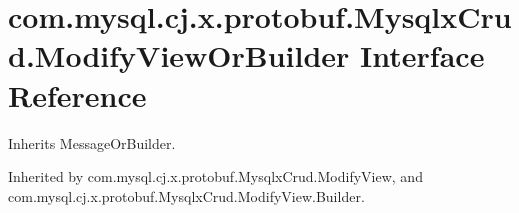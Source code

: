 \hypertarget{interfacecom_1_1mysql_1_1cj_1_1x_1_1protobuf_1_1_mysqlx_crud_1_1_modify_view_or_builder}{}\section{com.\+mysql.\+cj.\+x.\+protobuf.\+Mysqlx\+Crud.\+Modify\+View\+Or\+Builder Interface Reference}
\label{interfacecom_1_1mysql_1_1cj_1_1x_1_1protobuf_1_1_mysqlx_crud_1_1_modify_view_or_builder}


Inherits Message\+Or\+Builder.



Inherited by com.\+mysql.\+cj.\+x.\+protobuf.\+Mysqlx\+Crud.\+Modify\+View, and com.\+mysql.\+cj.\+x.\+protobuf.\+Mysqlx\+Crud.\+Modify\+View.\+Builder.

